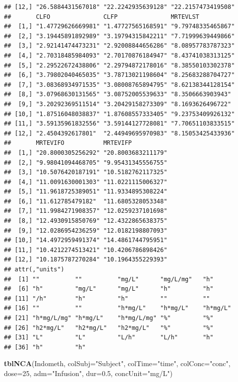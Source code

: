 \documentclass[]{krantz}
\makeatletter
\newenvironment{Shaded}{\begin{snugshade}}{\end{snugshade}}
\newcommand{\KeywordTok}[1]{\textcolor[rgb]{0.13,0.29,0.53}{\textbf{#1}}}
\newcommand{\DataTypeTok}[1]{\textcolor[rgb]{0.13,0.29,0.53}{#1}}
\newcommand{\DecValTok}[1]{\textcolor[rgb]{0.00,0.00,0.81}{#1}}
\newcommand{\FloatTok}[1]{\textcolor[rgb]{0.00,0.00,0.81}{#1}}
\newcommand{\StringTok}[1]{\textcolor[rgb]{0.31,0.60,0.02}{#1}}
\newcommand{\NormalTok}[1]{#1}
\newenvironment{kframe}{%
\medskip{}
\setlength{\fboxsep}{.8em}
 \def\at@end@of@kframe{}%
 \ifinner\ifhmode%
  \def\at@end@of@kframe{\end{minipage}}%
  \begin{minipage}{\columnwidth}%
 \fi\fi%
 \def\FrameCommand##1{\hskip\@totalleftmargin \hskip-\fboxsep
 \colorbox{shadecolor}{##1}\hskip-\fboxsep
     \hskip-\linewidth \hskip-\@totalleftmargin \hskip\columnwidth}%
 \MakeFramed {\advance\hsize-\width
   \@totalleftmargin\z@ \linewidth\hsize
   \@setminipage}}%
 {\par\unskip\endMakeFramed%
 \at@end@of@kframe}
\renewenvironment{Shaded}{\begin{kframe}}{\end{kframe}}
\theoremstyle{definition}
\theoremstyle{definition}
\theoremstyle{definition}
\theoremstyle{remark}
\makeatother
\begin{document}
\begin{verbatim}
## [12,] "26.5884431567018" "22.2242935639128" "22.2157473419508"
##       CLFO               CLFP               MRTEVLST          
##  [1,] "1.47729626669981" "1.47727565168591" "9.79748335465867"
##  [2,] "3.19445891892989" "3.19794315842211" "7.71999639449866"
##  [3,] "2.92141474473231" "2.92008844656286" "8.08957783787323"
##  [4,] "2.70318485984093" "2.70170876184947" "8.43741038313125"
##  [5,] "2.29522672438806" "2.29794872178016" "8.38550103302378"
##  [6,] "3.79802040465035" "3.78713021198604" "8.25683288704727"
##  [7,] "3.08368934971535" "3.08008765894795" "8.62138344128154"
##  [8,] "3.07968630131565" "3.08752005539633" "8.3506663903943" 
##  [9,] "3.20292369511514" "3.20429158273309" "8.1693626496722" 
## [10,] "1.87516048038837" "1.87608557333405" "9.23753409926132"
## [11,] "3.59135961832556" "3.59144127728081" "7.70651103833515"
## [12,] "2.4504392617801"  "2.44949695970983" "8.15053425433936"
##       MRTEVIFO           MRTEVIFP          
##  [1,] "20.8000305256292" "20.8003683211179"
##  [2,] "9.98041094468705" "9.95431345556755"
##  [3,] "10.5076420187191" "10.5182762117325"
##  [4,] "11.0091630001303" "11.0221115006327"
##  [5,] "11.9618725389051" "11.9334895308224"
##  [6,] "11.612785479182"  "11.6805328053348"
##  [7,] "11.9984271908357" "12.0259237101698"
##  [8,] "12.4930915850769" "12.4322865638375"
##  [9,] "12.0286954236259" "12.0182198807093"
## [10,] "14.4972959491374" "14.4861744795951"
## [11,] "10.4212274513421" "10.4206786898426"
## [12,] "10.1875787270284" "10.1964355229393"
## attr(,"units")
##  [1] ""          ""          "mg/L"      "mg/L/mg"   "h"        
##  [6] "h"         "mg/L"      "mg/L"      "h"         "h"        
## [11] "/h"        "h"         "h"         ""          ""         
## [16] ""          ""          "h*mg/L"    "h*mg/L"    "h*mg/L"   
## [21] "h*mg/L/mg" "h*mg/L"    "h*mg/L/mg" "%"         "%"        
## [26] "h2*mg/L"   "h2*mg/L"   "h2*mg/L"   "%"         "%"        
## [31] "L"         "L"         "L/h"       "L/h"       "h"        
## [36] "h"         "h"
\end{verbatim}

\begin{Shaded}
\begin{Highlighting}[]
\KeywordTok{tblNCA}\NormalTok{(Indometh, }\DataTypeTok{colSubj=}\StringTok{"Subject"}\NormalTok{, }\DataTypeTok{colTime=}\StringTok{"time"}\NormalTok{, }\DataTypeTok{colConc=}\StringTok{"conc"}\NormalTok{, }\DataTypeTok{dose=}\DecValTok{25}\NormalTok{, }
       \DataTypeTok{adm=}\StringTok{"Infusion"}\NormalTok{, }\DataTypeTok{dur=}\FloatTok{0.5}\NormalTok{, }\DataTypeTok{concUnit=}\StringTok{"mg/L"}\NormalTok{)}
\end{Highlighting}
\end{Shaded}
\end{document}
